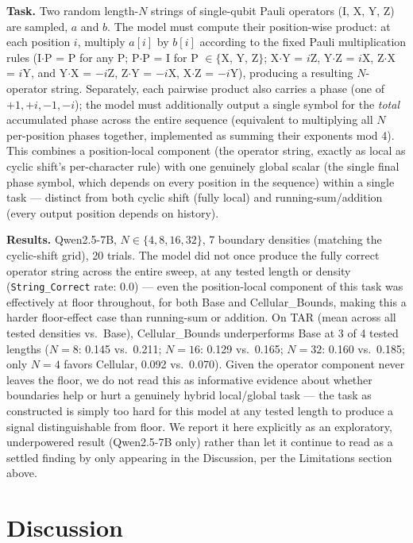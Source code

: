 \documentclass[11pt]{article}
\begin{document}
\textbf{Task.} Two random length-$N$ strings of single-qubit Pauli operators (I, X, Y, Z) are sampled, $a$ and $b$. The model must compute their position-wise product: at each position $i$, multiply $a[i]$ by $b[i]$ according to the fixed Pauli multiplication rules (I$\cdot$P = P for any P; P$\cdot$P = I for P $\in \{$X, Y, Z$\}$; X$\cdot$Y = $i$Z, Y$\cdot$Z = $i$X, Z$\cdot$X = $i$Y, and Y$\cdot$X = $-i$Z, Z$\cdot$Y = $-i$X, X$\cdot$Z = $-i$Y), producing a resulting $N$-operator string. Separately, each pairwise product also carries a phase (one of $+1, +i, -1, -i$); the model must additionally output a single symbol for the \emph{total} accumulated phase across the entire sequence (equivalent to multiplying all $N$ per-position phases together, implemented as summing their exponents mod 4). This combines a position-local component (the operator string, exactly as local as cyclic shift's per-character rule) with one genuinely global scalar (the single final phase symbol, which depends on every position in the sequence) within a single task --- distinct from both cyclic shift (fully local) and running-sum/addition (every output position depends on history).

\textbf{Results.} Qwen2.5-7B, $N \in \{4, 8, 16, 32\}$, 7 boundary densities (matching the cyclic-shift grid), 20 trials. The model did not once produce the fully correct operator string across the entire sweep, at any tested length or density (\texttt{String\_Correct} rate: 0.0) --- even the position-local component of this task was effectively at floor throughout, for both Base and Cellular\_Bounds, making this a harder floor-effect case than running-sum or addition. On TAR (mean across all tested densities vs.\ Base), Cellular\_Bounds underperforms Base at 3 of 4 tested lengths ($N=8$: 0.145 vs.\ 0.211; $N=16$: 0.129 vs.\ 0.165; $N=32$: 0.160 vs.\ 0.185; only $N=4$ favors Cellular, 0.092 vs.\ 0.070). Given the operator component never leaves the floor, we do not read this as informative evidence about whether boundaries help or hurt a genuinely hybrid local/global task --- the task as constructed is simply too hard for this model at any tested length to produce a signal distinguishable from floor. We report it here explicitly as an exploratory, underpowered result (Qwen2.5-7B only) rather than let it continue to read as a settled finding by only appearing in the Discussion, per the Limitations section above.

\section{Discussion}
\label{sec:discussion}
\end{document}
